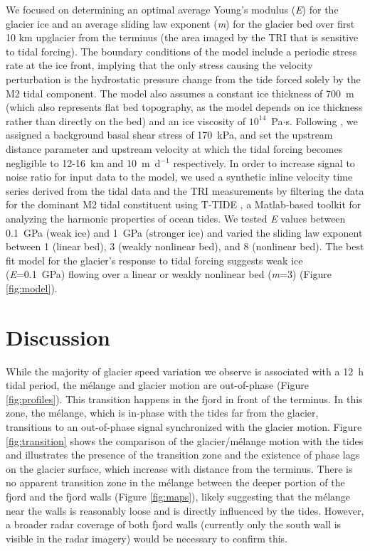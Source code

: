 \documentclass[review]{igs}
\begin{document}
We focused on determining an optimal average Young's modulus (\textit{E}) for the glacier ice and an average sliding law exponent (\textit{m}) for the glacier bed over first 10 km upglacier from the terminus (the area imaged by the TRI that is sensitive to tidal forcing).   The boundary conditions of the model include a periodic stress rate at the ice front, implying that the only stress causing the velocity perturbation is the hydrostatic pressure change from the tide forced solely by the M2 tidal component.  The model also assumes a constant ice thickness of 700~m (which also represents flat bed topography, as the model depends on ice thickness rather than directly on the bed) and an ice viscosity of $10^{14}$~Pa$\cdot$s. Following \citet{verger2011tidewater}, we assigned a background basal shear stress of 170~kPa, and set the upstream distance parameter and upstream velocity at which the tidal forcing becomes negligible to 12-16~km and 10~m~d$^{-1}$ respectively. In order to increase signal to noise ratio for input data to the model, we used a synthetic inline velocity time series derived from the tidal data and the TRI measurements by filtering the data for the dominant M2 tidal constituent using T-TIDE \citep{pawlowicz2002classical}, a Matlab-based toolkit for analyzing the harmonic properties of ocean tides.  We tested \textit{E} values between 0.1~GPa (weak ice) and 1~GPa (stronger ice) and varied the sliding law exponent between 1 (linear bed), 3 (weakly nonlinear bed), and 8 (nonlinear bed). The best fit model for the glacier's response to tidal forcing suggests weak ice (\textit{E}=0.1~GPa) flowing over a linear or weakly nonlinear bed (\textit{m}=3) (Figure \ref{fig:model}). 



\section{Discussion}
While the majority of glacier speed variation we observe is associated with a 12~h tidal period, the m\'elange and glacier motion are out-of-phase (Figure \ref{fig:profiles}). This transition happens in the fjord in front of the terminus. In this zone, the m\'elange, which is in-phase with the tides far from the glacier, transitions to an out-of-phase signal synchronized with the glacier motion. Figure \ref{fig:transition} shows the comparison of the glacier/m\'elange motion with the tides and illustrates the presence of the transition zone and the existence of phase lags on the glacier surface, which increase with distance from the terminus. There is no apparent transition zone in the m\'elange between the deeper portion of the fjord and the fjord walls (Figure \ref{fig:maps}), likely suggesting that the m\'elange near the walls is reasonably loose and is directly influenced by the tides. However, a broader radar coverage of both fjord walls (currently only the south wall is visible in the radar imagery) would be necessary to confirm this. 
\end{document}
